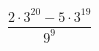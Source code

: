 \begin{ex}[type=calculate]
	\begin{condition}
		\( \dfrac{2\cdot3^{20}-5\cdot3^{19}}{9^9} \)
	\end{condition}
\end{ex}